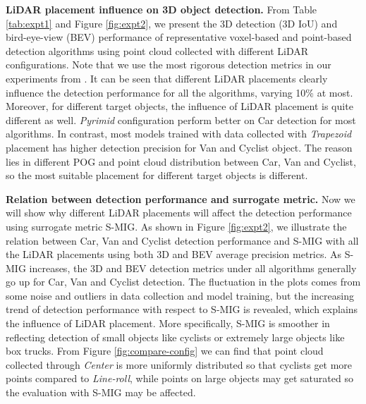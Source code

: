 \documentclass[10pt,twocolumn,letterpaper]{article}
\newcommand{\todo}[1]{\hl{[#1]}}
\begin{document}
\textbf{LiDAR placement influence on 3D object detection.} From Table \ref{tab:expt1} and Figure \ref{fig:expt2}, we present the 3D detection (3D IoU) and bird-eye-view (BEV) performance of representative voxel-based and point-based detection algorithms using point cloud collected with different LiDAR configurations. Note that we use the most rigorous detection metrics in our experiments from \cite{openpcdet2020}. It can be seen that different LiDAR placements clearly influence the detection performance for all the algorithms, varying 10\% at most. Moreover, for different target objects, the influence of LiDAR placement is quite different as well. \textit{Pyrimid} configuration perform better on Car detection for most algorithms. In contrast, most models trained with data collected with \textit{Trapezoid} placement has  higher detection precision for Van and Cyclist object. The reason lies in different POG and point cloud distribution between Car, Van and Cyclist, so the most suitable placement for different target objects is different.

\textbf{Relation between detection performance and surrogate metric.} Now we will show why different LiDAR placements will affect the detection performance using surrogate metric S-MIG. As shown in Figure \ref{fig:expt2}, we illustrate the relation between Car, Van and Cyclist detection performance and S-MIG with all the LiDAR placements using both 3D and BEV average precision metrics. As S-MIG increases, the 3D and BEV detection metrics under all algorithms generally go up for Car, Van and Cyclist detection. The fluctuation in the plots comes from some noise and outliers in data collection and model training, but the increasing trend of detection performance with respect to S-MIG is  revealed, which explains the influence of LiDAR placement. More specifically, S-MIG is smoother in reflecting detection of small objects like cyclists or extremely large objects like box trucks.
From Figure \ref{fig:compare-config} we can find that  point cloud collected through \textit{Center} is more uniformly distributed so that cyclists get more points  compared to \textit{Line-roll}, while points on large objects may get saturated so the evaluation with S-MIG may be affected.

\end{document}
